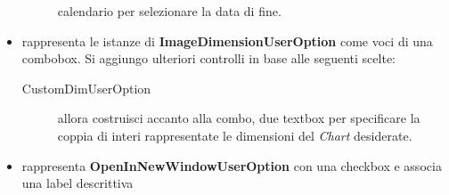 \begin{itemize}
\begin{description}
    calendario per selezionare la data di fine.
  \end{description}  
  \item rappresenta le istanze di \textbf{ImageDimensionUserOption} come voci di
  una combobox. Si aggiungo ulteriori controlli in base alle seguenti scelte:
  \begin{description}
    \item[CustomDimUserOption] allora costruisci accanto alla combo, due
    textbox per specificare la coppia di interi rappresentate le dimensioni del
    \emph{Chart} desiderate.
  \end{description}
  \item rappresenta \textbf{OpenInNewWindowUserOption} con una checkbox e associa una
  label descrittiva
\end{itemize}